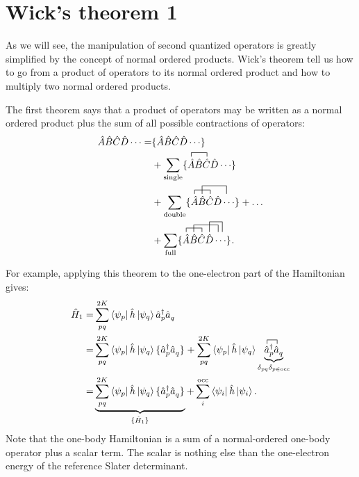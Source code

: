 \documentclass[../Main/chem532-notes.tex]{subfiles}
\begin{document}
\section{Wick's theorem 1}
As we will see, the manipulation of second quantized operators is greatly simplified by the concept of normal ordered products.
Wick's theorem tell us how to go from a product of operators to its normal ordered product and how to multiply two normal ordered products.

The first theorem says that a product of operators may be written as a normal ordered product plus the sum of all possible contractions of operators:
\begin{equation}
\begin{split}
\hat{A}\hat{B}\hat{C}\hat{D}\cdots
=&
\no{\hat{A}\hat{B}\hat{C}\hat{D}\cdots} \\
&+
\sum_\mathrm{single}
\no{
\contraction{}{\hat{A}}{\hat{B}}{\hat{C}}
\hat{A}\hat{B}\hat{C}\hat{D}\cdots} \\
&+
\sum_\mathrm{double}
\no{
\contraction{}{\hat{A}}{\hat{B}}{\hat{C}}
\contraction[2ex]{\hat{A}}{\hat{B}}{\hat{C}\hat{D}}{\hat{D}}
\hat{A}\hat{B}\hat{C}\hat{D}\cdots}
+ \ldots \\
&+\sum_\mathrm{full}
\no{
\contraction{}{\hat{A}}{\hat{B}}{\hat{C}}
\contraction[1.75ex]{\hat{A}}{\hat{B}}{\hat{C}\hat{D}}{\hat{D}}
\contraction[2.5ex]{\hat{A}\hat{B}\hat{C}}{\hat{D}}{\hat{D}}{}
\hat{A}\hat{B}\hat{C}\hat{D}\cdots}.
\end{split}
\end{equation}

For example, applying this theorem to the one-electron part of the Hamiltonian gives:
\begin{equation}
\begin{split}
\hat{H}_1 =& \sum_{pq}^{2K} \bra{\psi_p} \hat{h} \ket{\psi_q} \cop{p} \aop{q} \\
=& \sum_{pq}^{2K} \bra{\psi_p} \hat{h} \ket{\psi_q} \no{\cop{p} \aop{q}}
+ \sum_{pq}^{2K} \bra{\psi_p} \hat{h} \ket{\psi_q}
\underbrace{\contraction{}{\hat{a}}{_{p}}{\hat{a}}
\cop{p} \aop{q}}_{\delta_{pq}\delta_{p \in \mathrm{occ}}} \\
=& \underbrace{\sum_{pq}^{2K} \bra{\psi_p} \hat{h} \ket{\psi_q} \no{\cop{p} \aop{q}}}_{\no{\hat{H}_1}}
+ \sum_{i}^\mathrm{occ} \bra{\psi_i} \hat{h} \ket{\psi_i}.
\end{split}
\end{equation}
Note that the one-body Hamiltonian is a sum of a normal-ordered one-body operator plus a scalar term.
The scalar is nothing else than the one-electron energy of the reference Slater determinant.
\end{document}
